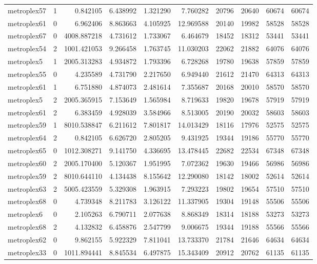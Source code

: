 \begin{longtable}{|l|r|r|r|r|r|r|r|r|r|}
metroplex57 & 1 & 0.842105 & 6.438992 & 1.321290 & 7.760282 & 20796 & 20640 & 60674 & 60674 \\
metroplex61 & 0 & 6.962406 & 8.863663 & 4.105925 & 12.969588 & 20140 & 19982 & 58528 & 58528 \\
metroplex67 & 0 & 4008.887218 & 4.731612 & 1.733067 & 6.464679 & 18452 & 18312 & 53441 & 53441 \\
metroplex54 & 2 & 1001.421053 & 9.266458 & 1.763745 & 11.030203 & 22062 & 21882 & 64076 & 64076 \\
metroplex5 & 1 & 2005.313283 & 4.934872 & 1.793396 & 6.728268 & 19780 & 19638 & 57859 & 57859 \\
metroplex55 & 0 & 4.235589 & 4.731790 & 2.217650 & 6.949440 & 21612 & 21470 & 64313 & 64313 \\
metroplex61 & 1 & 6.751880 & 4.874073 & 2.481614 & 7.355687 & 20168 & 20010 & 58570 & 58570 \\
metroplex5 & 2 & 2005.365915 & 7.153649 & 1.565984 & 8.719633 & 19820 & 19678 & 57919 & 57919 \\
metroplex61 & 2 & 6.383459 & 4.928039 & 3.584966 & 8.513005 & 20190 & 20032 & 58603 & 58603 \\
metroplex59 & 1 & 8010.538847 & 6.211612 & 7.801817 & 14.013429 & 18116 & 17976 & 52575 & 52575 \\
metroplex64 & 2 & 0.842105 & 6.626720 & 2.805205 & 9.431925 & 19344 & 19186 & 55770 & 55770 \\
metroplex65 & 0 & 1012.308271 & 9.141750 & 4.336695 & 13.478445 & 22682 & 22534 & 67348 & 67348 \\
metroplex60 & 2 & 2005.170400 & 5.120367 & 1.951995 & 7.072362 & 19630 & 19466 & 56986 & 56986 \\
metroplex59 & 2 & 8010.644110 & 4.134438 & 8.155642 & 12.290080 & 18142 & 18002 & 52614 & 52614 \\
metroplex63 & 2 & 5005.423559 & 5.329308 & 1.963915 & 7.293223 & 19802 & 19654 & 57510 & 57510 \\
metroplex68 & 0 & 4.739348 & 8.211783 & 3.126122 & 11.337905 & 19304 & 19148 & 55506 & 55506 \\
metroplex6 & 0 & 2.105263 & 6.790711 & 2.077638 & 8.868349 & 18314 & 18188 & 53273 & 53273 \\
metroplex68 & 2 & 4.132832 & 6.458876 & 2.547799 & 9.006675 & 19344 & 19188 & 55566 & 55566 \\
metroplex62 & 0 & 9.862155 & 5.922329 & 7.811041 & 13.733370 & 21784 & 21646 & 64634 & 64634 \\
metroplex33 & 0 & 1011.894441 & 8.845534 & 6.497875 & 15.343409 & 20912 & 20762 & 61135 & 61135 \\

\end{longtable}
